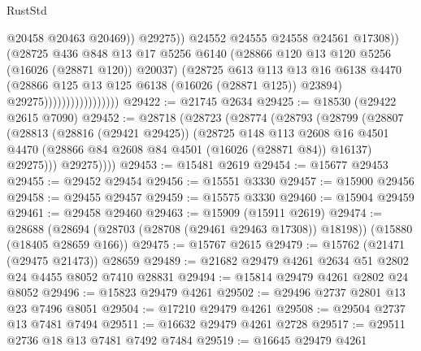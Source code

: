 \begin{lexlean}{RustStd}
\begin{coremodule}
                                              @20458
                                              @20463
                                              @20469))
                                          @29275))
                                      @24552
                                      @24555
                                      @24558
                                      @24561
                                      @17308))
                                  (@28725
                                    @436
                                    @848
                                    @13
                                    @17
                                    @5256
                                    @6140
                                    (@28866 @120 @13 @120 @5256 (@16026 (@28871 @120)) @20037)
                                    (@28725
                                      @613
                                      @113
                                      @13
                                      @16
                                      @6138
                                      @4470
                                      (@28866 @125 @13 @125 @6138 (@16026 (@28871 @125)) @23894)
                                      @29275)))))))))))))))))
@29422 := @21745 @2634
@29425 := @18530 (@29422 @2615 @7090)
@29452 := @28718
    (@28723
      (@28774
        (@28793
          (@28799
            (@28807
              (@28813
                (@28816 (@29421 @29425))
                (@28725
                  @148
                  @113
                  @2608
                  @16
                  @4501
                  @4470
                  (@28866 @84 @2608 @84 @4501 (@16026 (@28871 @84)) @16137)
                  @29275)))
            @29275))))
@29453 := @15481 @2619
@29454 := @15677 @29453
@29455 := @29452 @29454
@29456 := @15551 @3330
@29457 := @15900 @29456
@29458 := @29455 @29457
@29459 := @15575 @3330
@29460 := @15904 @29459
@29461 := @29458 @29460
@29463 := @15909 (@15911 @2619)
@29474 := @28688
    (@28694 (@28703 (@28708 (@29461 @29463 @17308)) @18198))
    (@15880 (@18405 @28659 @166))
@29475 := @15767 @2615
@29479 := @15762 (@21471 (@29475 @21473)) @28659
@29489 := @21682 @29479 @4261 @2634 @51 @2802 @24 @4455 @8052 @7410 @28831
@29494 := @15814 @29479 @4261 @2802 @24 @8052
@29496 := @15823 @29479 @4261
@29502 := @29496 @2737 @2801 @13 @23 @7496 @8051
@29504 := @17210 @29479 @4261
@29508 := @29504 @2737 @13 @7481 @7494
@29511 := @16632 @29479 @4261 @2728
@29517 := @29511 @2736 @18 @13 @7481 @7492 @7484
@29519 := @16645 @29479 @4261

\end{coremodule}
\end{lexlean}

